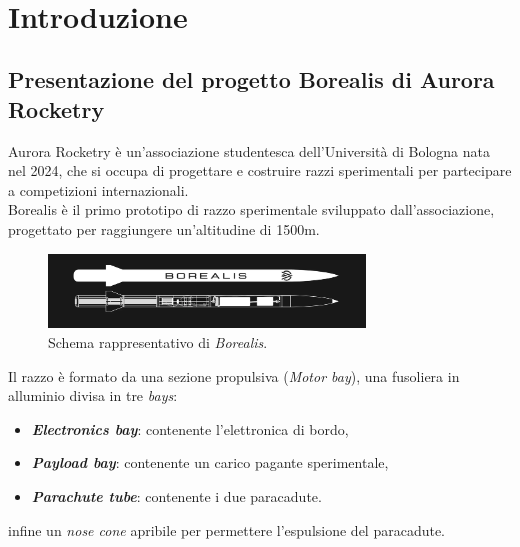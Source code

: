 \documentclass[12pt,a4paper,twoside]{book}
\begin{document}
\topmargin=-1cm
\tableofcontents
\thispagestyle{empty}
\listoftables
\thispagestyle{empty}
\listoffigures
\thispagestyle{empty}
\newpage~\newpage


\setcounter{chapter}{0}
\raggedbottom
\chapter{Introduzione} \label{chap:intro}
\pagestyle{plain}
\setcounter{page}{1}

\section{Presentazione del progetto Borealis di Aurora Rocketry}
Aurora Rocketry è un'associazione studentesca dell'Università di Bologna nata
nel 2024, che si occupa di progettare e costruire razzi sperimentali per
partecipare a competizioni internazionali. \\
Borealis è il primo prototipo di razzo sperimentale sviluppato
dall'associazione, progettato per raggiungere un'altitudine di 1500m.

\begin{figure}[H]
    \centering
    \includegraphics[width=0.75\textwidth]{img/borealis-schema.png}
    \caption{Schema rappresentativo di \emph{Borealis}.}
    \label{fig:borealis-schema}
\end{figure}

Il razzo è formato da una sezione propulsiva (\emph{Motor bay}), una fusoliera
in alluminio divisa in tre \emph{bays}:
\begin{itemize}
    \item \textbf{\emph{Electronics bay}}: contenente l'elettronica di bordo,
    \item \textbf{\emph{Payload bay}}: contenente un carico pagante sperimentale,
    \item \textbf{\emph{Parachute tube}}: contenente i due paracadute.
\end{itemize}
infine un \emph{nose cone} apribile per permettere l'espulsione del paracadute.\\
\end{document}
